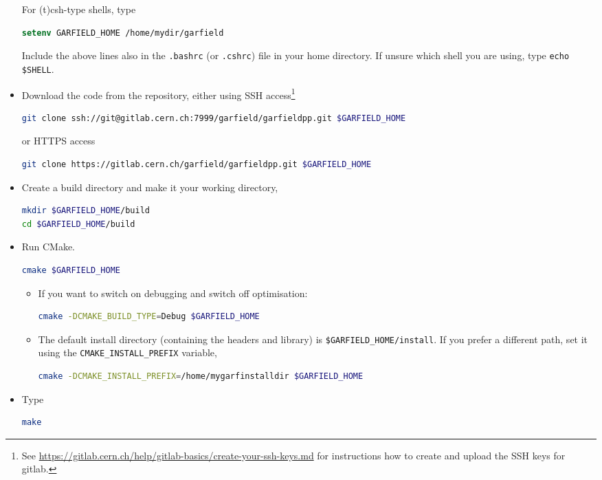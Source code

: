 \begin{itemize}
  For (t)csh-type shells, type
\begin{lstlisting}[language=csh]
setenv GARFIELD_HOME /home/mydir/garfield
\end{lstlisting}
  Include the above lines also in the \texttt{.bashrc} 
  (or \texttt{.cshrc}) file in your home directory. 
  If unsure which shell you are using, 
  type \texttt{echo \${SHELL}}.
  \item
  Download the code from the repository, either 
  using SSH access\footnote{See \url{https://gitlab.cern.ch/help/gitlab-basics/create-your-ssh-keys.md}
for instructions how to create and upload the SSH keys for gitlab.} 
\begin{lstlisting}[language=bash]
git clone ssh://git@gitlab.cern.ch:7999/garfield/garfieldpp.git $GARFIELD_HOME
\end{lstlisting}
  or HTTPS access
\begin{lstlisting}[language=bash]
git clone https://gitlab.cern.ch/garfield/garfieldpp.git $GARFIELD_HOME
\end{lstlisting}
  \item
  Create a build directory and make it your working directory, \eg
\begin{lstlisting}[language=bash]
mkdir $GARFIELD_HOME/build
cd $GARFIELD_HOME/build
\end{lstlisting}
  \item
  Run CMake.
\begin{lstlisting}[language=bash]
cmake $GARFIELD_HOME
\end{lstlisting}
  \begin{itemize}
  \item
  If you want to switch on debugging and switch off optimisation:
\begin{lstlisting}[language=bash]
cmake -DCMAKE_BUILD_TYPE=Debug $GARFIELD_HOME
\end{lstlisting}
  \item
  The default install directory (containing the headers and library) 
  is \texttt{\$GARFIELD\_HOME/install}. If you prefer a different path, 
    set it using the \texttt{CMAKE\_INSTALL\_PREFIX} variable, \eg
\begin{lstlisting}[language=bash]
cmake -DCMAKE_INSTALL_PREFIX=/home/mygarfinstalldir $GARFIELD_HOME
\end{lstlisting} 
    \end{itemize}
    \item
    Type
\begin{lstlisting}[language=bash]
make
\end{lstlisting}

\end{itemize}

